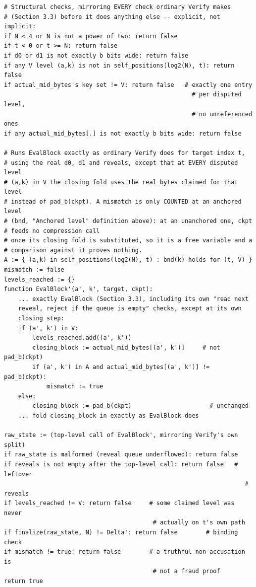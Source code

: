 \begin{algorithm}[H]
\caption{$\textsc{VerifyFraudProof}(N, \Delta', t, V, d_0, d_1, \mathit{reveals}, \mathit{actual\_mid\_bytes})$ -- $O(\log N)$}
\begin{lstlisting}[style=pseudo]
# Structural checks, mirroring EVERY check ordinary Verify makes
# (Section 3.3) before it does anything else -- explicit, not implicit:
if N < 4 or N is not a power of two: return false
if t < 0 or t >= N: return false
if d0 or d1 is not exactly b bits wide: return false
if any V level (a,k) is not in self_positions(log2(N), t): return false
if actual_mid_bytes's key set != V: return false   # exactly one entry
                                                     # per disputed level,
                                                     # no unreferenced ones
if any actual_mid_bytes[.] is not exactly b bits wide: return false

# Runs EvalBlock exactly as ordinary Verify does for target index t,
# using the real d0, d1 and reveals, except that at EVERY disputed level
# (a,k) in V the closing fold uses the real bytes claimed for that level
# instead of pad_b(ckpt). A mismatch is only COUNTED at an anchored level
# (bnd, "Anchored level" definition above): at an unanchored one, ckpt
# feeds no compression call
# once its closing fold is substituted, so it is a free variable and a
# comparison against it proves nothing.
A := { (a,k) in self_positions(log2(N), t) : bnd(k) holds for (t, V) }
mismatch := false
levels_reached := {}
function EvalBlock'(a', k', target, ckpt):
    ... exactly EvalBlock (Section 3.3), including its own "read next
    reveal, reject if the queue is empty" checks, except at its own
    closing step:
    if (a', k') in V:
        levels_reached.add((a', k'))
        closing_block := actual_mid_bytes[(a', k')]     # not pad_b(ckpt)
        if (a', k') in A and actual_mid_bytes[(a', k')] != pad_b(ckpt):
            mismatch := true
    else:
        closing_block := pad_b(ckpt)                      # unchanged
    ... fold closing_block in exactly as EvalBlock does

raw_state := (top-level call of EvalBlock', mirroring Verify's own split)
if raw_state is malformed (reveal queue underflowed): return false
if reveals is not empty after the top-level call: return false   # leftover
                                                                    # reveals
if levels_reached != V: return false     # some claimed level was never
                                          # actually on t's own path
if finalize(raw_state, N) != Delta': return false        # binding check
if mismatch != true: return false        # a truthful non-accusation is
                                          # not a fraud proof
return true
\end{lstlisting}
\end{algorithm}

